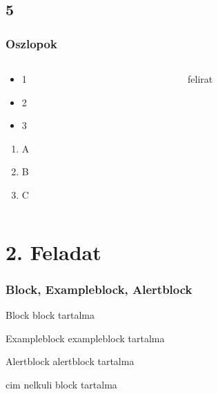 \documentclass[aspectratio=169, 12pt]{beamer}
\begin{document}
\subsection{5}
\begin{frame}
  \frametitle{Oszlopok}
  \begin{columns}
    \begin{column}{0.5\textwidth}
      \begin{itemize}
        \item 1
        \pause
        \item 2
        \pause
        \item 3
        \pause
      \end{itemize}
      \begin{enumerate}
        \item A
        \item B
        \item C
      \end{enumerate}
    \end{column}
    \begin{column}{0.5\textwidth}
    	\begin{figure}
      	\caption{felirat}
      \end{figure}
    \end{column}
  \end{columns}
\end{frame}

\section{2. Feladat}

\begin{frame}
  \frametitle{Block, Exampleblock, Alertblock}
  \begin{block}{Block}
    block tartalma
  \end{block}

  \begin{exampleblock}{Exampleblock}
    exampleblock tartalma
  \end{exampleblock}

  \begin{alertblock}{Alertblock}
    alertblock tartalma
  \end{alertblock}

  \begin{block}{}
    cim nelkuli block tartalma
  \end{block}
\end{frame}
\end{document}
